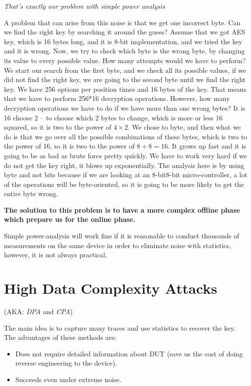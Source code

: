 \textit{That's exactly our problem with simple power analysis}

A problem that can arise from this noise is that we get one incorrect byte.
Can we find the right key by searching it around the guess?
Assume that we got AES key, which is 16 bytes long, and it is 8-bit implementation, and we tried the key and it is wrong.
Now, we try to check which byte is the wrong byte, by changing its value to every possible value.
How many attempts would we have to perform?
We start our search from the first byte, and we check all its possible values, if we did not find the right key, we are going to the second byte until we find the right key.
We have 256 options per position times and 16 bytes of the key.
That means that we have to perform 256*16 decryption operations.
However, how many decryption operations we have to do if we have more than one wrong bytes?
It is 16 choose 2 – to choose which 2 bytes to change, which is more or less 16 squared, so it is two to the power of $4\times2$.
We chose to byte, and then what we do is that we go over all the possible combinations of these bytes, which is two to the power of 16, so it is two to the power of $8+8=16$.
It grows up fast and it is going to be as bad as brute force pretty quickly.
We have to work very hard if we do not get the key right, it blows up exponentially.
The analysis here is by using byte and not bits because if we are looking at an 8-bit8-bit micro-controller, a lot of the operations will be byte-oriented, so it is going to be more likely to get the entire byte wrong.

\textbf{The solution to this problem is to have a more complex offline phase which prepare us for the online phase.}

Simple power-analysis will work fine if it is reasonable to conduct thousands of measurements on the same device in order to eliminate noise with statistics, however, it is not always practical.

\section{High Data Complexity Attacks}

(AKA: \textit{DPA} and \textit{CPA})

The main idea is to capture many traces and use statistics to recover the key.
The advantages of these methods are:
\begin{itemize}
    \item Does not require detailed information about DUT (save us the cost of doing reverse engineering to the device).
    \item Succeeds even under extreme noise.
\end{itemize}

